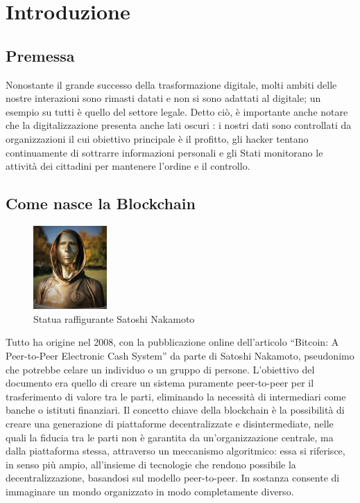 \chapter{Introduzione}
\section{Premessa}
Nonostante il grande successo della trasformazione digitale, molti ambiti delle nostre interazioni sono rimasti datati e non si sono adattati al digitale; un esempio su tutti è quello del settore legale. Detto ciò, è importante anche notare che la digitalizzazione presenta anche lati oscuri \cite{La_quarta_rivoluzione_industriale}: i nostri dati sono controllati da organizzazioni il cui obiettivo principale è il profitto, gli hacker tentano continuamente di sottrarre informazioni personali e gli Stati monitorano le attività dei cittadini per mantenere l’ordine e il controllo.

\section{Come nasce la Blockchain}
\begin{figure} %
    \centering
    \includegraphics[width=0.25\textwidth]{Immagini/Satoshi_Nakamoto.jpg}
    \caption{Statua raffigurante Satoshi Nakamoto}
\end{figure}
Tutto ha origine nel 2008, con la pubblicazione online dell’articolo “Bitcoin: A Peer-to-Peer Electronic Cash System” da parte di Satoshi Nakamoto, pseudonimo che potrebbe celare un individuo o un gruppo di persone. L’obiettivo del documento era quello di creare un sistema puramente peer-to-peer per il trasferimento di valore tra le parti, eliminando la necessità di intermediari come banche o istituti finanziari.
Il concetto chiave della blockchain è la possibilità di creare una generazione di piattaforme decentralizzate e disintermediate, nelle quali la fiducia tra le parti non è garantita da un’organizzazione centrale, ma dalla piattaforma stessa, attraverso un meccanismo algoritmico: essa si riferisce, in senso più ampio, all’insieme di tecnologie che rendono possibile la decentralizzazione, basandosi sul modello peer-to-peer.
In sostanza consente di immaginare un mondo organizzato in modo completamente diverso.
